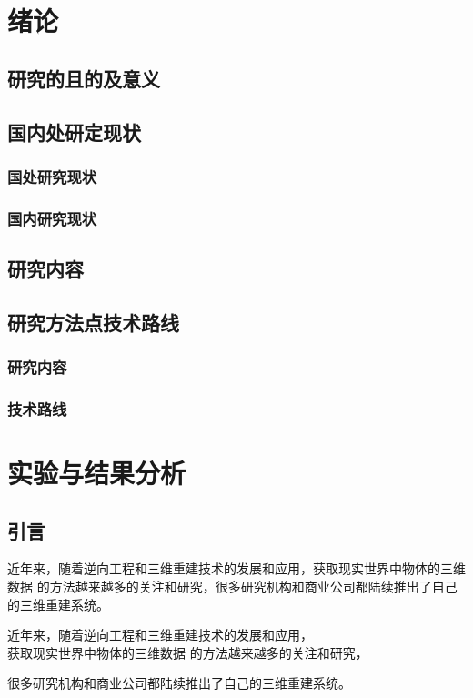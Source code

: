 \documentclass{ctexbook}
\begin{document}
    \tableofcontents

    \chapter{绪论}
    \section{研究的且的及意义}
    \section{国内处研定现状}
    \subsection{国处研究现状}
    \subsection{国内研究现状}
    \section{研究内容}
    \section{研究方法点技术路线}
    \subsection{研究内容}
    \subsection{技术路线}

    \chapter{实验与结果分析}
    \section{引言}
    近年来，随着逆向工程和三维重建技术的发展和应用，获取现实世界中物体的三维数据
    的方法越来越多的关注和研究，很多研究机构和商业公司都陆续推出了自己的三维重建系统。

    近年来，随着逆向工程和三维重建技术的发展和应用，\\获取现实世界中物体的三维数据
    的方法越来越多的关注和研究，\par 很多研究机构和商业公司都陆续推出了自己的三维重建系统。
\end{document}
